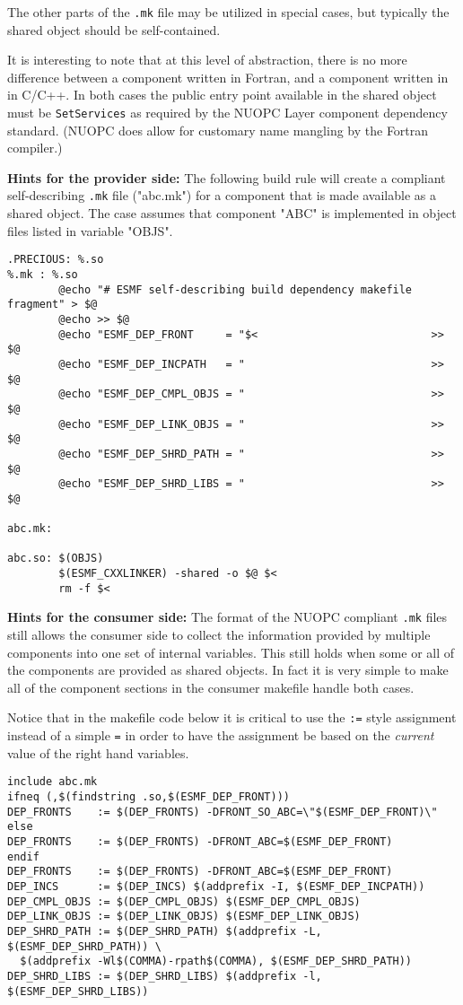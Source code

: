 The other parts of the {\tt .mk} file may be utilized in special cases, but typically the shared object should be self-contained.

It is interesting to note that at this level of abstraction, there is no more difference between a component written in Fortran, and a component written in  in C/C++. In both cases the public entry point available in the shared object must be {\tt SetServices} as required by the NUOPC Layer component dependency standard. (NUOPC does allow for customary name mangling by the Fortran compiler.)

{\bf Hints for the provider side:} The following build rule will create a compliant self-describing {\tt .mk} file ("abc.mk") for a component that is made available as a shared object. The case assumes that component "ABC" is implemented in object files listed in variable "OBJS".

\begin{verbatim}
.PRECIOUS: %.so
%.mk : %.so
        @echo "# ESMF self-describing build dependency makefile fragment" > $@
        @echo >> $@
        @echo "ESMF_DEP_FRONT     = "$<                           >> $@
        @echo "ESMF_DEP_INCPATH   = "                             >> $@
        @echo "ESMF_DEP_CMPL_OBJS = "                             >> $@
        @echo "ESMF_DEP_LINK_OBJS = "                             >> $@
        @echo "ESMF_DEP_SHRD_PATH = "                             >> $@
        @echo "ESMF_DEP_SHRD_LIBS = "                             >> $@

abc.mk:

abc.so: $(OBJS)
        $(ESMF_CXXLINKER) -shared -o $@ $<
        rm -f $<
\end{verbatim}

{\bf Hints for the consumer side:} The format of the NUOPC compliant {\tt .mk} files still allows the consumer side to collect the information provided by multiple components into one set of internal variables. This still holds when some or all of the components are provided as shared objects. In fact it is very simple to make all of the component sections in the consumer makefile handle both cases.

Notice that in the makefile code below it is critical to use the {\tt :=} style assignment instead of a simple {\tt =} in order to have the assignment be based on the {\em current} value of the right hand variables.

\begin{verbatim}
include abc.mk
ifneq (,$(findstring .so,$(ESMF_DEP_FRONT)))
DEP_FRONTS    := $(DEP_FRONTS) -DFRONT_SO_ABC=\"$(ESMF_DEP_FRONT)\"
else
DEP_FRONTS    := $(DEP_FRONTS) -DFRONT_ABC=$(ESMF_DEP_FRONT)
endif
DEP_FRONTS    := $(DEP_FRONTS) -DFRONT_ABC=$(ESMF_DEP_FRONT)
DEP_INCS      := $(DEP_INCS) $(addprefix -I, $(ESMF_DEP_INCPATH))
DEP_CMPL_OBJS := $(DEP_CMPL_OBJS) $(ESMF_DEP_CMPL_OBJS)
DEP_LINK_OBJS := $(DEP_LINK_OBJS) $(ESMF_DEP_LINK_OBJS)
DEP_SHRD_PATH := $(DEP_SHRD_PATH) $(addprefix -L, $(ESMF_DEP_SHRD_PATH)) \
  $(addprefix -Wl$(COMMA)-rpath$(COMMA), $(ESMF_DEP_SHRD_PATH))
DEP_SHRD_LIBS := $(DEP_SHRD_LIBS) $(addprefix -l, $(ESMF_DEP_SHRD_LIBS))
\end{verbatim}

